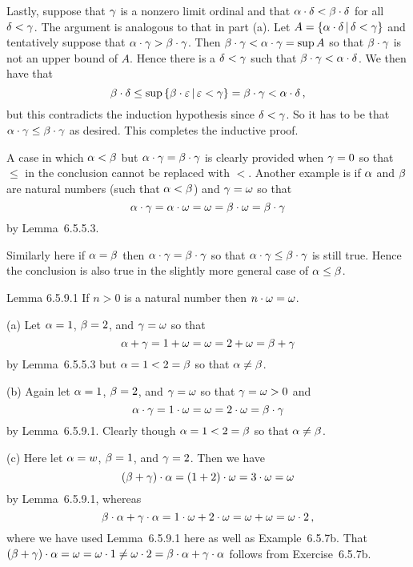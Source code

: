 \begin{solution}
    Lastly, suppose that $\gamma$ is a nonzero limit ordinal and that $\alpha \cdot \delta < \beta \cdot \delta$ for all $\delta < \gamma$.
    The argument is analogous to that in part (a).
    Let $A = \left\{ \alpha \cdot \delta \,|\, \delta < \gamma \right\}$ and tentatively suppose that $\alpha \cdot \gamma > \beta \cdot \gamma$.
    Then $\beta \cdot \gamma < \alpha \cdot \gamma = \sup{A}$ so that $\beta \cdot \gamma$ is not an upper bound of $A$.
    Hence there is a $\delta < \gamma$ such that $\beta \cdot \gamma < \alpha \cdot \delta$.
    We then have that
    $$
    \beta \cdot \delta \leq \sup\left\{ \beta \cdot \varepsilon \,|\, \varepsilon < \gamma \right\} = \beta \cdot \gamma < \alpha \cdot \delta \,,
    $$
    but this contradicts the induction hypothesis since $\delta < \gamma$.
    So it has to be that $\alpha \cdot \gamma \leq \beta \cdot \gamma$ as desired.
    This completes the inductive proof.

    A case in which $\alpha < \beta$ but $\alpha \cdot \gamma = \beta \cdot \gamma$ is clearly provided when $\gamma = 0$ so that $\leq$ in the conclusion cannot be replaced with $<$. Another example is if $\alpha$ and $\beta$ are natural numbers (such that $\alpha < \beta$) and $\gamma = \omega$ so that
    $$
    \alpha \cdot \gamma = \alpha \cdot \omega = \omega = \beta \cdot \omega = \beta \cdot \gamma
    $$
    by Lemma~6.5.5.3.

    Similarly here if $\alpha = \beta$ then $\alpha \cdot \gamma = \beta \cdot \gamma$ so that $\alpha \cdot \gamma \leq \beta \cdot \gamma$ is still true.
    Hence the conclusion is also true in the slightly more general case of $\alpha \leq \beta$. \qedsymbol
\end{solution}


\begin{solution}
    \begin{statement}{Lemma 6.5.9.1}
        If $n > 0$ is a natural number then $n \cdot \omega = \omega$.
    \end{statement}


    \mainprob

	(a) Let $\alpha = 1$, $\beta = 2$, and $\gamma = \omega$ so that
    $$
    \alpha + \gamma = 1 + \omega = \omega = 2 + \omega = \beta + \gamma
    $$
    by Lemma~6.5.5.3 but $\alpha = 1 < 2 = \beta$ so that $\alpha \neq \beta$.

    (b) Again let $\alpha = 1$, $\beta = 2$, and $\gamma = \omega$ so that $\gamma = \omega > 0$ and
    $$
    \alpha \cdot \gamma = 1 \cdot \omega = \omega = 2 \cdot \omega = \beta \cdot \gamma
    $$
    by Lemma~6.5.9.1.
    Clearly though $\alpha = 1 < 2 = \beta$ so that $\alpha \neq \beta$.

    (c) Here let $\alpha = w$, $\beta = 1$, and $\gamma = 2$.
    Then we have
    $$
    (\beta + \gamma) \cdot \alpha = (1 + 2) \cdot \omega = 3 \cdot \omega = \omega
    $$
    by Lemma~6.5.9.1, whereas
    $$
    \beta \cdot \alpha + \gamma \cdot \alpha = 1 \cdot \omega + 2 \cdot \omega = \omega + \omega = \omega \cdot 2 \,,
    $$
    where we have used Lemma~6.5.9.1 here as well as Example~6.5.7b.
    That $(\beta + \gamma) \cdot \alpha = \omega = \omega \cdot 1 \neq \omega \cdot 2 = \beta \cdot \alpha + \gamma \cdot \alpha$ follows from Exercise~6.5.7b.
\end{solution}

